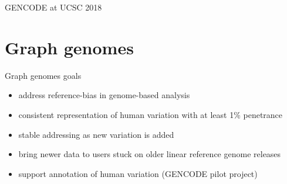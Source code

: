 \documentclass[10pt,
               hyperref={bookmarks=false,
                         bookmarksopen=false,
                         colorlinks=true,
                         linkcolor=blue,
                         urlcolor=blue},
               xcolor={svgnames,table}]{beamer}
\newcommand{\sectionframe}[1]{
  \begin{frame}{\thetitle}
    \section{#1}
  \end{frame}
}
\newcommand{\thetitle}{GENCODE at UCSC 2018}
\begin{document}
\sectionframe{Graph genomes}

\begin{frame}{Graph genomes goals}
  \begin{itemize}
  \item address reference-bias in genome-based analysis
  \item consistent representation of human variation with at least 1\% penetrance
  \item stable addressing as new variation is added
  \item bring newer data to users stuck on older linear reference genome releases
  \item support annotation of human variation (GENCODE pilot project)
  \end{itemize}
\end{frame}
\end{document}

